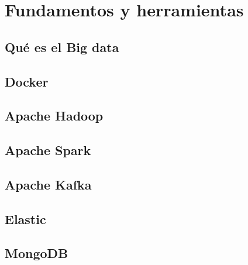 \section{Fundamentos y herramientas}


\subsection{Qué es el Big data}
\subsection{Docker}
\subsection{Apache Hadoop}
\subsection{Apache Spark}
\subsection{Apache Kafka}
\subsection{Elastic}
\subsection{MongoDB}
